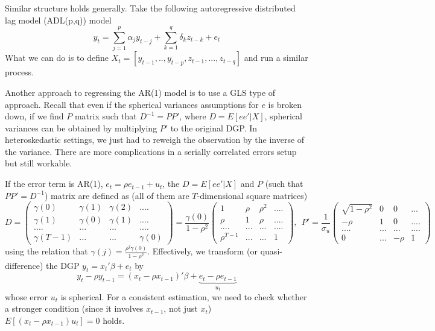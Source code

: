 \documentclass[12pt]{article}
\theoremstyle{definition}
\theoremstyle{property}
\theoremstyle{assumption}
\theoremstyle{example}
\theoremstyle{comment}
\begin{document}
\par
Similar structure holds generally. Take the following autoregressive distributed lag model (ADL(p,q)) model
\[
y_t = \sum_{j=1}^p \alpha_j y_{t-j}+\sum_{k=1}^q \delta_k z_{t-k}+e_t
\]
What we can do is to define $X_t = [y_{t-1},..,y_{t-p},z_{t-1},...,z_{t-q}]$ and run a similar process.
\par
Another approach to regressing the AR(1) model is to use a GLS type of approach. Recall that even if the spherical variances assumptions for $e$ is broken down, if we find $P$ matrix such that $D^{-1}=PP'$, where $D=E[ee'|X]$, spherical variances can be obtained by multiplying $P'$ to the original DGP. In heteroskedastic settings, we just had to reweigh the observation by the inverse of the variance. There are more complications in a serially correlated errors setup but still workable.
\par
If the error term is AR(1), $e_t = \rho e_{t-1}+u_t$, the $D=E[ee'|X]$ and $P$ (such that $PP'=D^{-1}$) matrix are defined as (all of them are $T$-dimensional square matrices)
\footnotesize{\[
D=\begin{pmatrix}\gamma(0)  & \gamma(1) & \gamma(2) & ....\\ \gamma(1) & \gamma(0) & \gamma(1) & ....\\.... & ... & ... & ....\\ \gamma(T-1) & ... & ... & \gamma(0) \end{pmatrix}=\frac{\gamma(0)}{1-\rho^2}\begin{pmatrix} 1 & \rho & \rho^2 & ....\\ \rho & 1 & \rho & ....\\.... & ... & ... & ....\\ \rho^{T-1} & ... & ... & 1\end{pmatrix}, \ \  P'=\frac{1}{\sigma_u}\begin{pmatrix} \sqrt{1-\rho^2} & 0 & 0 & ...\\ -\rho & 1 & 0 & ....\\.... & ... & ... & ....\\0 & ... & -\rho & 1\end{pmatrix}
\]}\normalsize
using the relation that $\gamma(j)=\frac{\rho^j\gamma(0)}{1-\rho^2}$. Effectively, we transform (or quasi-difference) the DGP $y_t = x_t'\beta+e_t$ by
\[
y_{t}-\rho y_{t-1} = (x_t-\rho x_{t-1})'\beta + \underbrace{e_t-\rho e_{t-1}}_{u_t}
\]
whose error $u_t$ is spherical. For a consistent estimation, we need to check whether a stronger condition (since it involves $x_{t-1}$, not just $x_t$) $E[(x_t-\rho x_{t-1})u_t]=0$ holds.
\end{document}
